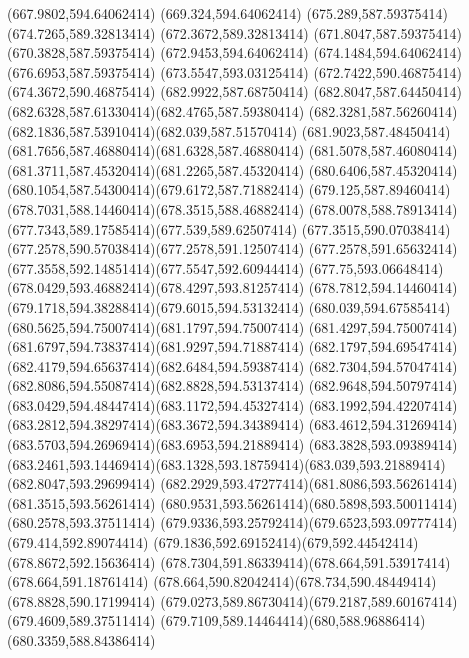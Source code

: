 {{	\lineto(667.9802,594.64062414)
	\lineto(669.324,594.64062414)
	\closepath
	\moveto(675.289,587.59375414)
	\lineto(674.7265,589.32813414)
	\lineto(672.3672,589.32813414)
	\lineto(671.8047,587.59375414)
	\lineto(670.3828,587.59375414)
	\lineto(672.9453,594.64062414)
	\lineto(674.1484,594.64062414)
	\lineto(676.6953,587.59375414)
	\closepath
	\moveto(673.5547,593.03125414)
	\lineto(672.7422,590.46875414)
	\lineto(674.3672,590.46875414)
	\closepath
	\moveto(682.9922,587.68750414)
	\curveto(682.8047,587.64450414)(682.6328,587.61330414)(682.4765,587.59380414)
	\curveto(682.3281,587.56260414)(682.1836,587.53910414)(682.039,587.51570414)
	\curveto(681.9023,587.48450414)(681.7656,587.46880414)(681.6328,587.46880414)
	\curveto(681.5078,587.46080414)(681.3711,587.45320414)(681.2265,587.45320414)
	\curveto(680.6406,587.45320414)(680.1054,587.54300414)(679.6172,587.71882414)
	\curveto(679.125,587.89460414)(678.7031,588.14460414)(678.3515,588.46882414)
	\curveto(678.0078,588.78913414)(677.7343,589.17585414)(677.539,589.62507414)
	\curveto(677.3515,590.07038414)(677.2578,590.57038414)(677.2578,591.12507414)
	\curveto(677.2578,591.65632414)(677.3558,592.14851414)(677.5547,592.60944414)
	\curveto(677.75,593.06648414)(678.0429,593.46882414)(678.4297,593.81257414)
	\curveto(678.7812,594.14460414)(679.1718,594.38288414)(679.6015,594.53132414)
	\curveto(680.039,594.67585414)(680.5625,594.75007414)(681.1797,594.75007414)
	\curveto(681.4297,594.75007414)(681.6797,594.73837414)(681.9297,594.71887414)
	\curveto(682.1797,594.69547414)(682.4179,594.65637414)(682.6484,594.59387414)
	\curveto(682.7304,594.57047414)(682.8086,594.55087414)(682.8828,594.53137414)
	\curveto(682.9648,594.50797414)(683.0429,594.48447414)(683.1172,594.45327414)
	\curveto(683.1992,594.42207414)(683.2812,594.38297414)(683.3672,594.34389414)
	\curveto(683.4612,594.31269414)(683.5703,594.26969414)(683.6953,594.21889414)
	\lineto(683.3828,593.09389414)
	\curveto(683.2461,593.14469414)(683.1328,593.18759414)(683.039,593.21889414)
	\lineto(682.8047,593.29699414)
	\curveto(682.2929,593.47277414)(681.8086,593.56261414)(681.3515,593.56261414)
	\curveto(680.9531,593.56261414)(680.5898,593.50011414)(680.2578,593.37511414)
	\curveto(679.9336,593.25792414)(679.6523,593.09777414)(679.414,592.89074414)
	\curveto(679.1836,592.69152414)(679,592.44542414)(678.8672,592.15636414)
	\curveto(678.7304,591.86339414)(678.664,591.53917414)(678.664,591.18761414)
	\curveto(678.664,590.82042414)(678.734,590.48449414)(678.8828,590.17199414)
	\curveto(679.0273,589.86730414)(679.2187,589.60167414)(679.4609,589.37511414)
	\curveto(679.7109,589.14464414)(680,588.96886414)(680.3359,588.84386414)
}}
